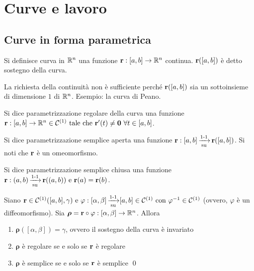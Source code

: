 \chapter{Curve e lavoro}\label{chap:curves}

\section{Curve in forma parametrica}

\begin{definition}
	[Curva]
	Si definisce curva in $\mathbb{R}^n$ una funzione $\vb{r}:[a,b]\to \mathbb{R}^n$ continua. $\vb{r}([a,b])$ è detto sostegno della curva.
\end{definition}

\begin{remark}
	La richiesta della continuità non è sufficiente perché $\vb{r}([a,b])$ sia un sottoinsieme di dimensione $1$ di $\mathbb{R}^n$. Esempio: la curva di Peano.
\end{remark}

\begin{definition}
	Si dice parametrizzazione regolare della curva una funzione $\vb{r}:[a,b]\to \mathbb{R}^n \in \mathcal{C}^{(1)} \text{ tale che } \vb{r}'(t)\neq\vb{0} \ \forall t \in [a,b]$.
\end{definition}

\begin{definition}
	Si dice parametrizzazione semplice aperta una funzione $\vb{r}: [a,b]\operatorname{\xrightarrow[\operatorname{su}]{\operatorname{1-1}}}\vb{r}([a,b])$. Si noti che $\vb{r}$ è un omeomorfismo.
\end{definition}

\begin{definition}
	Si dice parametrizzazione semplice chiusa una funzione $\vb{r}: (a,b)\operatorname{\xrightarrow[\operatorname{su}]{\operatorname{1-1}}} \vb{r}((a,b)) \text{ e } \vb{r}(a)=\vb{r}(b)$.
\end{definition}

\begin{theorem}
	Siano $\vb{r} \in \mathcal{C}^{(1)}([a,b],\gamma) \text{ e } \varphi:[\alpha,\beta]\operatorname{\xrightarrow[\operatorname{su}]{\operatorname{1-1}}}[a,b]\\\in \mathcal{C}^{(1)} \text{ con } \varphi^{-1} \in \mathcal{C}^{(1)}$ (ovvero, $\varphi$ è un diffeomorfismo). Sia $\bm\rho = \vb{r} \circ \varphi: [\alpha, \beta] \to \mathbb{R}^n$. Allora
	\begin{enumerate}
		\item $\bm\rho([\alpha,\beta])=\gamma$, ovvero il sostegno della curva è invariato
		\item $\bm\rho$ è regolare se e solo se $\vb{r}$ è regolare
		\item $\bm\rho$ è semplice se e solo se $\vb{r}$ è semplice
		\qed
	\end{enumerate}
\end{theorem}


